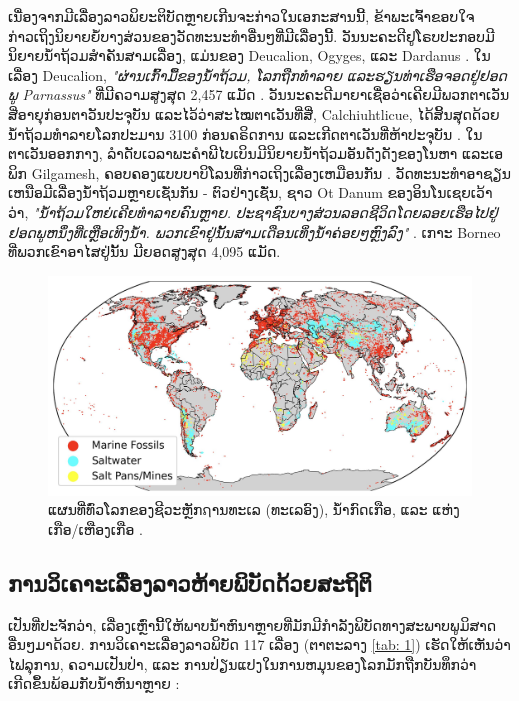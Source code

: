 \documentclass[10pt,twocolumn,letterpaper]{article}
\begin{document}
ເນື່ອງຈາກມີເລື່ອງລາວພິຍະຕິບັດຫຼາຍເກີນຈະກ່າວໃນເອກະສານນີ້, ຂ້າພະເຈົ້າຂອບໃຈກ່າວເຖິງນິຍາຍຍໍ້ບາງສ່ວນຂອງວັດທະນະທຳອື່ນໆທີ່ມີເລື່ອງນີ້. ວັນນະຄະດີຢູໂຣບປະກອບມີນິຍາຍນໍ້າຖ້ວມສຳຄັນສາມເລື່ອງ, ແມ່ນຂອງ Deucalion, Ogyges, ແລະ Dardanus \cite{9,10}. ໃນເລື່ອງ Deucalion, \textit{"ຜ່ານເກົ້າມື້ຂອງນໍ້າຖ້ວມ, ໂລກຖືກທຳລາຍ ແລະຮຽນທ່າເຮືອຈອດຢູ່ຢອດພູ Parnassus"} ທີ່ມີຄວາມສູງສຸດ 2,457 ແມັດ \cite{11}. ວັນນະຄະດີມາຍາເຊື່ອວ່າເຄີຍມີພວກຕາເວັນສີ່ອາຍຸກ່ອນຕາວັນປະຈຸບັນ ແລະໄວ້ວ່າສະໄໝຕາເວັນທີ່ສີ່, Calchiuhtlicue, ໄດ້ສິ້ນສຸດດ້ວຍນໍ້າຖ້ວມທຳລາຍໂລກປະມານ 3100 ກ່ອນຄຣິດການ ແລະເກີດຕາເວັນທີ່ຫ້າປະຈຸບັນ \cite{12}. ໃນຕາເວັນອອກກາງ, ລຳດັບເວລາພະຄຳພີໄບເບິນມີນິຍາຍນໍ້າຖ້ວມອັນດັງດັງຂອງໂນຫາ ແລະເອພິກ Gilgamesh, ຄອບຄອງແບບບາບິໂລນທີ່ກ່າວເຖິງເລື່ອງເຫມືອນກັນ \cite{13}. ວັດທະນະທຳອາຊຽນເຫນືອມີເລື່ອງນໍ້າຖ້ວມຫຼາຍເຊັ່ນກັນ - ຕົວຢ່າງເຊັ່ນ, ຊາວ Ot Danum ຂອງອິນໂນເຊຍເວ້າວ່າ, \textit{"ນໍ້າຖ້ວມໃຫຍ່ເຄີຍທຳລາຍຄົນຫຼາຍ. ປະຊາຊົນບາງສ່ວນລອດຊີວິດໂດຍລອຍເຮືອໄປຢູ່ຢອດພູຫນຶ່ງທີ່ເຫຼືອເທິງນໍ້າ. ພວກເຂົາຢູ່ນັ້ນສາມເດືອນເທິ່ງນໍ້າຄ່ອຍໆຫຼົງລົງ"} \cite{3}. ເກາະ Borneo ທີ່ພວກເຂົາອາໄສຢູ່ນັ້ນ ມີຍອດສູງສຸດ 4,095 ແມັດ.

\begin{figure}[b]
\begin{center}

\includegraphics[width=1\textwidth]{marine.jpg}
\end{center}
   \caption{ແຜນທີ່ທົ່ວໂລກຂອງຊີວະຫຼັກຐານທະເລ (ທະເລອົງ), ນ້ຳກົດເກືອ, ແລະ ແຫ່ງເກືອ/ເຫືອງເກືອ \cite{15,16,86,87}.}
   \label{fig:2}
\end{figure}

\subsection{ການວິເຄາະເລື່ອງລາວຫ້າຍພິບັດດ້ວຍສະຖິຕິ}

ເປັນທີ່ປະຈັກວ່າ, ເລື່ອງເຫຼົ່ານີ້ໃຫ້ພາບນ້ຳຫົນາຫຼາຍທີ່ມັກມີກຳລັງພິບັດທາງສະພາບພູມິສາດອື່ນໆມາດ້ວຍ. ການວິເຄາະເລື່ອງລາວພິບັດ 117 ເລື່ອງ (ຕາຕະລາງ \ref{tab: 1}) ເຮັດໃຫ້ເຫັນວ່າ ໄຟລຸການ, ຄວາມເປັນປ່າ, ແລະ ການປ່ຽນແປງໃນການຫມຸນຂອງໂລກມັກຖືກບັນທຶກວ່າເກີດຂຶ້ນພ້ອມກັບນ້ຳຫົນາຫຼາຍ \cite{14}:
\end{document}
